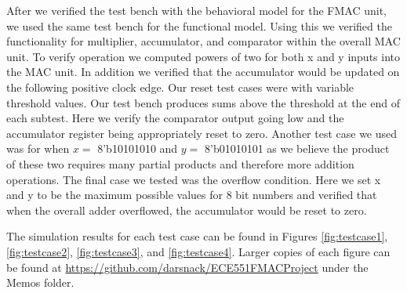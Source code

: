 \documentclass{memo}
\begin{document}
After we verified the test bench with the behavioral model for the FMAC unit, we used the same test bench for the functional model. Using this we verified the functionality for multiplier, accumulator, and comparator within the overall MAC unit. To verify operation we computed powers of two for both x and y inputs into the MAC unit. In addition we verified that the accumulator would be updated on the following positive clock edge. Our reset test cases were with variable threshold values. Our test bench produces sums above the threshold at the end of each subtest. Here we verify the comparator output going low and the accumulator register being appropriately reset to zero. Another test case we used was for when $x = $ 8'b10101010 and $y = $ 8'b01010101 as we believe the product of these two requires many partial products and therefore more addition operations. The final case we tested was the overflow condition. Here we set x and y to be the maximum possible values for 8 bit numbers and verified that when the overall adder overflowed, the accumulator would be reset to zero.

The simulation results for each test case can be found in Figures \ref{fig:testcase1}, \ref{fig:testcase2}, \ref{fig:testcase3}, and \ref{fig:testcase4}. Larger copies of each figure can be found at \url{https://github.com/darsnack/ECE551FMACProject} under the Memos folder.
\end{document}
